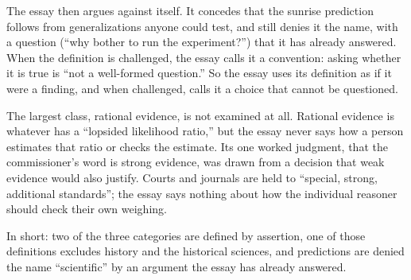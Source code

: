 \begin{afterword}
The essay then argues against itself. It concedes that the sunrise prediction follows from generalizations anyone could test, and still denies it the name, with a question (``why bother to run the experiment?'') that it has already answered. When the definition is challenged, the essay calls it a convention: asking whether it is true is ``not a well-formed question.'' So the essay uses its definition as if it were a finding, and when challenged, calls it a choice that cannot be questioned.

The largest class, rational evidence, is not examined at all. Rational evidence is whatever has a ``lopsided likelihood ratio,'' but the essay never says how a person estimates that ratio or checks the estimate. Its one worked judgment, that the commissioner's word is strong evidence, was drawn from a decision that weak evidence would also justify. Courts and journals are held to ``special, strong, additional standards''; the essay says nothing about how the individual reasoner should check their own weighing.

In short: two of the three categories are defined by assertion, one of those definitions excludes history and the historical sciences, and predictions are denied the name ``scientific'' by an argument the essay has already answered.
\end{afterword}
